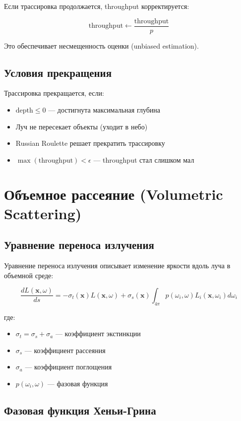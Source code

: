 \documentclass[14pt, a4paper]{extarticle}
\begin{document}
Если трассировка продолжается, throughput корректируется:

\[
\text{throughput} \leftarrow \frac{\text{throughput}}{p}
\]

Это обеспечивает несмещенность оценки (unbiased estimation).

\subsection{Условия прекращения}

Трассировка прекращается, если:
\begin{itemize}
    \item $\text{depth} \leq 0$ --- достигнута максимальная глубина
    \item Луч не пересекает объекты (уходит в небо)
    \item Russian Roulette решает прекратить трассировку
    \item $\max(\text{throughput}) < \epsilon$ --- throughput стал слишком мал
\end{itemize}

\section{Объемное рассеяние (Volumetric Scattering)}

\subsection{Уравнение переноса излучения}

Уравнение переноса излучения описывает изменение яркости вдоль луча в объемной среде:

\[
\frac{dL(\mathbf{x}, \omega)}{ds} = -\sigma_t(\mathbf{x}) L(\mathbf{x}, \omega) + \sigma_s(\mathbf{x}) \int_{4\pi} p(\omega_i, \omega) L_i(\mathbf{x}, \omega_i) d\omega_i
\]

где:
\begin{itemize}
    \item $\sigma_t = \sigma_s + \sigma_a$ --- коэффициент экстинкции
    \item $\sigma_s$ --- коэффициент рассеяния
    \item $\sigma_a$ --- коэффициент поглощения
    \item $p(\omega_i, \omega)$ --- фазовая функция
\end{itemize}

\subsection{Фазовая функция Хеньи-Грина}
\end{document}
